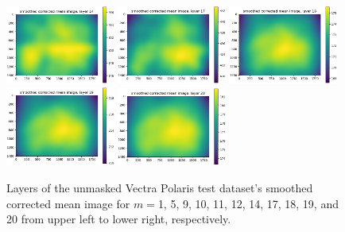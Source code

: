 \documentclass[letterpaper,11pt]{article}
\begin{document}
\begin{figure}[!ht]
\includegraphics[width=0.32\textwidth]{images/results/unmasked_smoothed_corrected_mean_image_layers_polaris/smoothed_corrected_mean_image_layer_14}
\includegraphics[width=0.32\textwidth]{images/results/unmasked_smoothed_corrected_mean_image_layers_polaris/smoothed_corrected_mean_image_layer_17}
\includegraphics[width=0.32\textwidth]{images/results/unmasked_smoothed_corrected_mean_image_layers_polaris/smoothed_corrected_mean_image_layer_18}
\includegraphics[width=0.32\textwidth]{images/results/unmasked_smoothed_corrected_mean_image_layers_polaris/smoothed_corrected_mean_image_layer_19}
\includegraphics[width=0.32\textwidth]{images/results/unmasked_smoothed_corrected_mean_image_layers_polaris/smoothed_corrected_mean_image_layer_20}
\caption{\footnotesize Layers of the unmasked Vectra Polaris test dataset's smoothed corrected mean image for $m=$1, 5, 9, 10, 11, 12, 14, 17, 18, 19, and 20 from upper left to lower right, respectively.}
\label{fig:unmasked_smoothed_corrected_mean_image_layers_polaris_1}
\end{figure}
\end{document}

